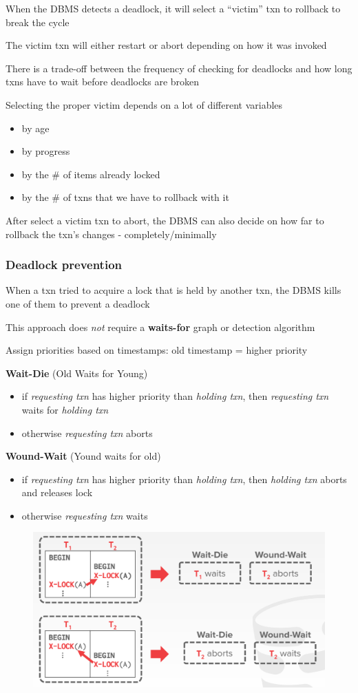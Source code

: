 \documentclass[11pt]{article}
\begin{document}
When the DBMS detects a deadlock, it will select a ``victim'' txn to rollback to break the cycle

The victim txn will either restart or abort depending on how it was invoked

There is a trade-off between the frequency of checking for deadlocks and how long txns have to
wait before deadlocks are broken

Selecting the proper victim depends on a lot of different variables
\begin{itemize}
\item by age
\item by progress
\item by the \# of items already locked
\item by the \# of txns that we have to rollback with it
\end{itemize}

After select a victim txn to abort, the DBMS can also decide on how far to rollback the txn's
changes - completely/minimally
\subsubsection{Deadlock prevention}
\label{sec:org260dab9}
When a txn tried to acquire a lock that is held by another txn, the DBMS kills one of them to
prevent a deadlock

This approach does \emph{not} require a \textbf{waits-for} graph or detection algorithm

Assign priorities based on timestamps: old timestamp = higher priority

\textbf{Wait-Die} (Old Waits for Young)
\begin{itemize}
\item if \emph{requesting txn} has higher priority than \emph{holding txn}, then \emph{requesting txn} waits for \emph{holding
txn}
\item otherwise \emph{requesting txn} aborts
\end{itemize}
\textbf{Wound-Wait} (Yound waits for old)
\begin{itemize}
\item if \emph{requesting txn} has higher priority than \emph{holding txn}, then \emph{holding txn} aborts and releases lock
\item otherwise \emph{requesting txn} waits
\end{itemize}

\begin{figure}[htbp]
\centering
\includegraphics[width=.8\textwidth]{../images/15445/62.png}
\label{}
\end{figure}
\end{document}
